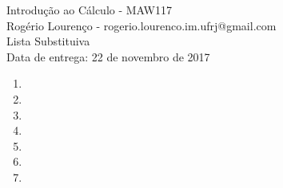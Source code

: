 \documentclass{article}
\begin{document}
\begin{flushleft}
	Introdução ao Cálculo - MAW117\\
	Rogério Lourenço - rogerio.lourenco.im.ufrj@gmail.com\\
	Lista Substituiva\\
	Data de entrega: 22 de novembro de 2017
\end{flushleft}

\begin{enumerate}
	\item 
	\item 
	\item 
	\item 
	\item 
	\item 
	\item 
\end{enumerate}
\end{document}
